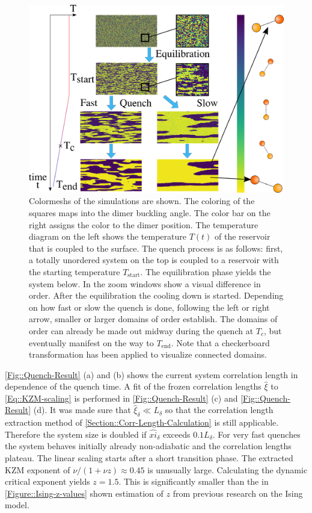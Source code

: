 	\begin{figure}
		\centering
		\includegraphics[width=\textwidth]{graphics/Quench-concept-plot.png}
		\caption{Colormeshs of the simulations are shown. The coloring of the squares maps into  the dimer buckling angle. The color bar on the right assigns the color to the dimer position. The temperature diagram on the left shows the temperature $T(t)$ of the reservoir that is coupled to the surface. The quench process is as follows: first, a totally unordered system on the top is coupled to a reservoir with the starting temperature $T_{\text{start}}$. The equilibration phase yields the system below. In the zoom windows show a visual difference in order. After the equilibration the cooling down is started. Depending on how fast or slow the quench is done, following the left or right arrow, smaller or larger domains of order establish. The domains of order can already be made out midway during the quench at $T_c$, but eventually manifest on the way to $T_{\text{end}}$. Note that a checkerboard transformation has been applied to visualize connected domains.}
		\label{Fig::quench-process-concept}
	\end{figure}
	\autoref{Fig::Quench-Result} (a) and (b) shows the current system correlation length in dependence of the quench time. A fit of the frozen correlation lengths $\hat{\xi}$ to \eqref{Eq::KZM-scaling} is performed in \autoref{Fig::Quench-Result} (c) and \autoref{Fig::Quench-Result} (d). It was made sure that $\hat{\xi}_\delta \ll L_\delta$ so that the correlation length extraction method of \autoref{Section::Corr-Length-Calculation} is still applicable. Therefore the system size is doubled if $\hat{xi}_\delta$ exceeds $0.1L_\delta$. For very fast quenches the system behaves initially already non-adiabatic and the correlation lengths plateau. The linear scaling starts after a short transition phase. The extracted KZM exponent of $\nu /( 1 + \nu z) \approx 0.45$ is unusually large. Calculating the dynamic critical exponent yields $z = 1.5$. This is significantly smaller than the in \autoref{Figure::Ising-z-values} shown estimation of $z$ from previous research on the Ising model. \\
	
